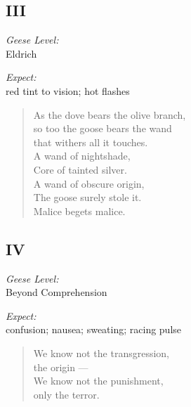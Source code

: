 \newpage

\subsection*{III}
\noindent\begin{paracol}{2}
    \begin{flushright}
      \textit{Geese Level:}\\
      Eldrich

      \textit{Expect:}\\
      red tint to vision; hot flashes
    \end{flushright}
    \switchcolumn
    \begin{verse}
      As the dove bears the olive branch, \\
      \vin so too the goose bears the wand \\
      \vin \vin that withers all it touches. \\
      A wand of nightshade, \\
      \vin Core of tainted silver.\\
      A wand of obscure origin,\\
      \vin The goose surely stole it. \\
      Malice begets malice.
    \end{verse}
\end{paracol}

\newpage

\subsection*{IV}

\noindent\begin{paracol}{2}
    \begin{flushright}
      \textit{Geese Level:}\\
      Beyond Comprehension

      \textit{Expect:}\\
      confusion; nausea; sweating; racing pulse
    \end{flushright}
  \switchcolumn
    \begin{verse}
      We know not the transgression,\\
      \vin the origin ---\\
      We know not the punishment,\\
      \vin only the terror.
    \end{verse}
\end{paracol}


